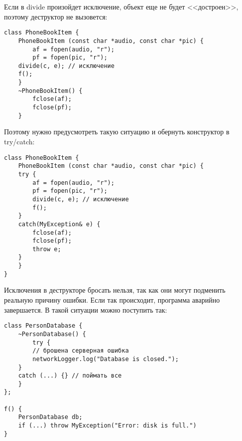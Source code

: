 \begin{minipage}{0.35\textwidth}
Если в divide произойдет  исключение, объект еще не будет <<достроен>>, поэтому деструктор не вызовется:
\end{minipage}
\hfill
\begin{minipage}{0.55\textwidth}
\begin{verbatim}
class PhoneBookItem {
    PhoneBookItem (const char *audio, const char *pic) {
        af = fopen(audio, "r");
        pf = fopen(pic, "r");
	divide(c, e); // исключение
	f();
    }
    ~PhoneBookItem() {
        fclose(af);
        fclose(pf);
    }
\end{verbatim}
\end{minipage}


\begin{minipage}{0.35\textwidth}
    Поэтому нужно предусмотреть такую ситуацию и обернуть конструктор в try/catch:
\end{minipage}
\hfill
\begin{minipage}{0.55\textwidth}
\begin{verbatim}
class PhoneBookItem {
    PhoneBookItem (const char *audio, const char *pic) {
	try {
	    af = fopen(audio, "r");
	    pf = fopen(pic, "r");
	    divide(c, e); // исключение
	    f();
	}
	catch(MyException& e) {
	    fclose(af);
	    fclose(pf);
	    throw e;
	}
    }
}
\end{verbatim}
\end{minipage}

\begin{minipage}{0.35\textwidth}
Исключения в деструкторе бросать нельзя, так как они могут подменить реальную причину ошибки. Если так происходит, программа аварийно завершается. В такой ситуации можно поступить так:
\end{minipage}
\hfill
\begin{minipage}{0.55\textwidth}
    \begin{verbatim}
class PersonDatabase {
    ~PersonDatabase() {
        try {
	    // брошена серверная ошибка
	    networkLogger.log("Database is closed.");
	}
	catch (...) {} // поймать все
    }
};

f() {
    PersonDatabase db;
    if (...) throw MyException("Error: disk is full.")
}
    \end{verbatim}
\end{minipage}
